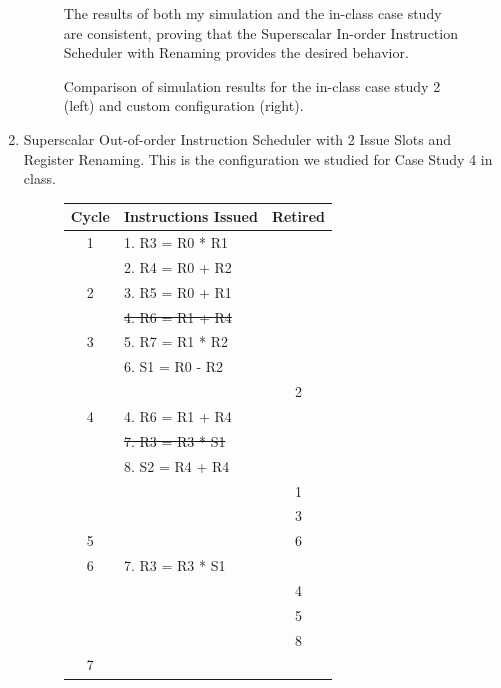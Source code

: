 \documentclass{article}
\begin{document}
\begin{enumerate}
\begin{figure}[H]
\begin{minipage}[t]{0.45\textwidth}
            The results of both my simulation and the in-class case study are consistent, proving that the Superscalar In-order Instruction Scheduler with Renaming provides the desired behavior.
        \end{minipage}
        \caption{Comparison of simulation results for the in-class case study 2 (left) and custom configuration (right).}
    \end{figure}
    \newpage
    \item Superscalar Out-of-order Instruction Scheduler with 2 Issue Slots and Register Renaming. This is the configuration we studied for Case Study 4 in class. 
    \begin{figure}[H]
        \centering
        \begin{minipage}[t]{0.45\textwidth}
            \centering
            \renewcommand{\arraystretch}{0.9} %
            \setlength{\tabcolsep}{3pt} %
            \begin{tabular}{|c|p{3.4cm}|c|}
                \hline
                \textbf{Cycle} & \textbf{Instructions Issued} & \textbf{Retired} \\ \hline
                1 & 1. R3 = R0 * R1 & \\ 
                  & 2. R4 = R0 + R2 & \\ \hline
                2 & 3. R5 = R0 + R1 & \\ 
                  & \sout{4. R6 = R1 + R4} & \\ \hline
                3 & 5. R7 = R1 * R2 & \\ 
                  & 6. S1 = R0 - R2 & \\
                  & & 2 \\ \hline 
                4 & 4. R6 = R1 + R4 & \\ 
                  & \sout{7. R3 = R3 * S1} & \\
                  & 8. S2 = R4 + R4 & \\
                  & & 1 \\
                  & & 3 \\ \hline 
                5 & & 6 \\ \hline 
                6 & 7. R3 = R3 * S1 & \\
                & & 4 \\ 
                & & 5 \\ 
                & & 8 \\ \hline 
                7 & & \\ \hline 

\end{tabular}
\end{minipage}
\end{figure}
\end{enumerate}
\end{document}
